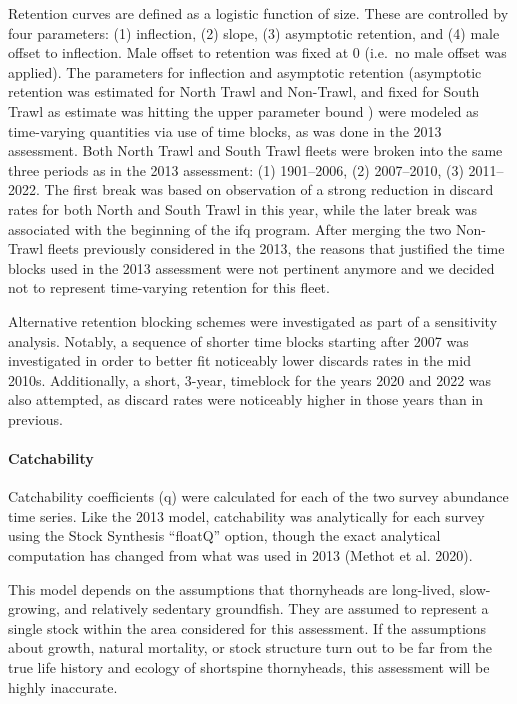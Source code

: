 \documentclass[11pt,
  english,
  letterpaper,
]{article}
\begin{document}
Retention curves are defined as a logistic function of size. These are controlled by four parameters: (1) inflection, (2) slope, (3) asymptotic retention, and (4) male offset to inflection. Male offset to retention was fixed at 0 (i.e.~no male offset was applied). The parameters for inflection and asymptotic retention (asymptotic retention was estimated for North Trawl and Non-Trawl, and fixed for South Trawl as estimate was hitting the upper parameter bound ) were modeled as time-varying quantities via use of time blocks, as was done in the 2013 assessment. Both North Trawl and South Trawl fleets were broken into the same three periods as in the 2013 assessment: (1) 1901--2006, (2) 2007--2010, (3) 2011--2022. The first break was based on observation of a strong reduction in discard rates for both North and South Trawl in this year, while the later break was associated with the beginning of the \gls{ifq} program. After merging the two Non-Trawl fleets previously considered in the 2013, the reasons that justified the time blocks used in the 2013 assessment were not pertinent anymore and we decided not to represent time-varying retention for this fleet.

Alternative retention blocking schemes were investigated as part of a sensitivity analysis. Notably, a sequence of shorter time blocks starting after 2007 was investigated in order to better fit noticeably lower discards rates in the mid 2010s. Additionally, a short, 3-year, timeblock for the years 2020 and 2022 was also attempted, as discard rates were noticeably higher in those years than in previous.

\hypertarget{catchability}{%
\paragraph{Catchability}\label{catchability}}

Catchability coefficients (q) were calculated for each of the two survey abundance time series. Like the 2013 model, catchability was analytically for each survey using the Stock Synthesis ``floatQ'' option, though the exact analytical computation has changed from what was used in 2013 (Methot et al. 2020).

This model depends on the assumptions that thornyheads are long-lived, slow-growing, and relatively sedentary groundfish. They are assumed to represent a single stock within the area considered for this assessment. If the assumptions about growth, natural mortality, or stock structure turn out to be far from the true life history and ecology of shortspine thornyheads, this assessment will be highly inaccurate.
\end{document}
